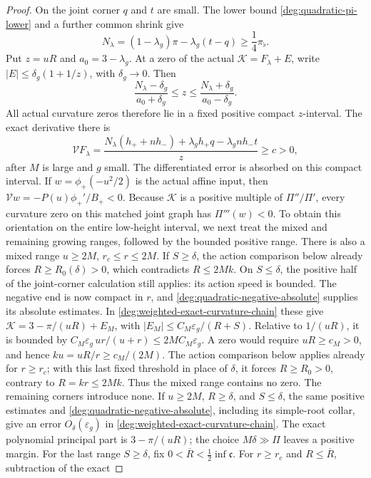 \begin{proof}
On the joint corner \(q\) and \(t\) are small.  The lower bound
\eqref{deg:quadratic-pi-lower} and a further common shrink give
\[
 N_\lambda=(1-\lambda_g)\pi-\lambda_g(t-q)
 \geq\frac14\pi_\flat .
\]
Put \(z=uR\) and \(a_0=3-\lambda_g\). At a zero of the actual
\(\mathscr K=F_\lambda+E\), write
\(|E|\le\delta_g(1+1/z)\), with \(\delta_g\to0\).
Then
\[
 \frac{N_\lambda-\delta_g}{a_0+\delta_g}
 \le z\le
 \frac{N_\lambda+\delta_g}{a_0-\delta_g}.
\]
All actual curvature zeros therefore lie in a fixed positive compact
\(z\)-interval. The exact derivative there is
\[
 \mathcal VF_\lambda
 =\frac{N_\lambda(h_++nh_-)
          +\lambda_gh_+q-\lambda_gnh_-t}{z}\ge c>0,
\]
after \(M\) is large and \(g\) small. The differentiated error is
absorbed on this compact interval. If
\(w=\phi_+(-u^2/2)\) is the actual affine input, then
\(\mathcal Vw=-P(u)\phi_+'/B_+<0\). Because \(\mathscr K\) is a positive
multiple of \(\Pi''/\Pi'\), every curvature zero on this matched joint
graph has \(\Pi'''(w)<0\). To obtain this orientation on the
entire low-height interval, we next treat the mixed and remaining
growing ranges, followed by the bounded positive range.
There is also a mixed range \(u\ge2M\), \(r_c\le r\le2M\).
If \(S\ge\delta\), the action comparison below already forces
\(R\ge R_0(\delta)>0\), which contradicts \(R\le2Mk\).
On \(S\le\delta\), the positive half of the joint-corner calculation
still applies: its action speed is bounded.  The negative end is now
compact in \(r\), and \eqref{deg:quadratic-negative-absolute} supplies
its absolute estimates.  In \eqref{deg:weighted-exact-curvature-chain} these give
\(\mathscr K=3-\pi/(uR)+E_M\), with
\(|E_M|\le C_M\varepsilon_g/(R+S)\).  Relative to
\(1/(uR)\), it is bounded by
\(C_M\varepsilon_g\,ur/(u+r)\le2MC_M\varepsilon_g\).
A zero would require \(uR\ge c_M>0\), and hence
\(ku=uR/r\ge c_M/(2M)\).  The action comparison below applies
already for \(r\ge r_c\); with this last fixed threshold in place
of \(\delta\), it forces \(R\ge R_0>0\), contrary to
\(R=kr\le2Mk\).  Thus the mixed range contains no zero.
The remaining corners introduce none.  If \(u\ge2M\),
\(R\ge\delta\), and \(S\le\delta\), the same positive estimates
and \eqref{deg:quadratic-negative-absolute}, including its simple-root
collar, give an error \(O_\delta(\varepsilon_g)\) in
\eqref{deg:weighted-exact-curvature-chain}.  The exact polynomial principal part
is \(3-\pi/(uR)\); the choice \(M\delta\gg\Pi\) leaves a
positive margin.  For the last range \(S\ge\delta\), fix
\(0<\overline R<\tfrac12\inf\mathfrak c\).
For \(r\ge r_c\) and \(R\le\overline R\), subtraction of the exact

\end{proof}

